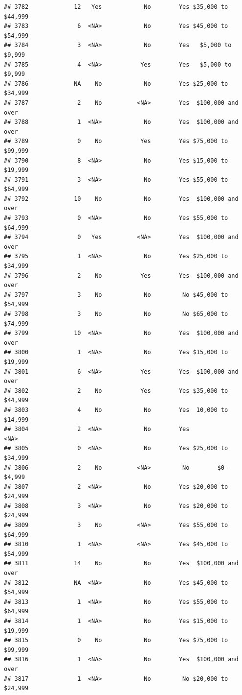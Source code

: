 \documentclass[man]{apa6}
\begin{document}
\begin{verbatim}
## 3782             12   Yes            No        Yes $35,000 to $44,999
## 3783              6  <NA>            No        Yes $45,000 to $54,999
## 3784              3  <NA>            No        Yes   $5,000 to $9,999
## 3785              4  <NA>           Yes        Yes   $5,000 to $9,999
## 3786             NA    No            No        Yes $25,000 to $34,999
## 3787              2    No          <NA>        Yes  $100,000 and over
## 3788              1  <NA>            No        Yes  $100,000 and over
## 3789              0    No           Yes        Yes $75,000 to $99,999
## 3790              8  <NA>            No        Yes $15,000 to $19,999
## 3791              3  <NA>            No        Yes $55,000 to $64,999
## 3792             10    No            No        Yes  $100,000 and over
## 3793              0  <NA>            No        Yes $55,000 to $64,999
## 3794              0   Yes          <NA>        Yes  $100,000 and over
## 3795              1  <NA>            No        Yes $25,000 to $34,999
## 3796              2    No           Yes        Yes  $100,000 and over
## 3797              3    No            No         No $45,000 to $54,999
## 3798              3    No            No         No $65,000 to $74,999
## 3799             10  <NA>            No        Yes  $100,000 and over
## 3800              1  <NA>            No        Yes $15,000 to $19,999
## 3801              6  <NA>           Yes        Yes  $100,000 and over
## 3802              2    No           Yes        Yes $35,000 to $44,999
## 3803              4    No            No        Yes  10,000 to $14,999
## 3804              2  <NA>            No        Yes               <NA>
## 3805              0  <NA>            No        Yes $25,000 to $34,999
## 3806              2    No          <NA>         No        $0 - $4,999
## 3807              2  <NA>            No        Yes $20,000 to $24,999
## 3808              3  <NA>            No        Yes $20,000 to $24,999
## 3809              3    No          <NA>        Yes $55,000 to $64,999
## 3810              1  <NA>          <NA>        Yes $45,000 to $54,999
## 3811             14    No            No        Yes  $100,000 and over
## 3812             NA  <NA>            No        Yes $45,000 to $54,999
## 3813              1  <NA>            No        Yes $55,000 to $64,999
## 3814              1  <NA>            No        Yes $15,000 to $19,999
## 3815              0    No            No        Yes $75,000 to $99,999
## 3816              1  <NA>            No        Yes  $100,000 and over
## 3817              1  <NA>            No         No $20,000 to $24,999

\end{verbatim}
\end{document}

